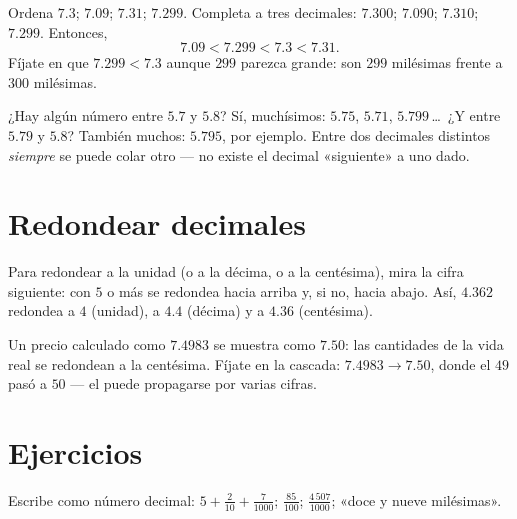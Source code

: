 \begin{example}\label{ex:g5:decimals:order}
Ordena $7.3$; $7.09$; $7.31$; $7.299$. Completa a tres decimales:
$7.300$; $7.090$; $7.310$; $7.299$. Entonces,
\[
7.09 < 7.299 < 7.3 < 7.31 .
\]
Fíjate en que $7.299 < 7.3$ aunque $299$ parezca grande: son $299$ milésimas
frente a $300$ milésimas.
\end{example}

\begin{example}\label{ex:g5:decimals:between}
¿Hay algún número entre $5.7$ y $5.8$? Sí, muchísimos: $5.75$,
$5.71$, $5.799$\,\dots\ ¿Y entre $5.79$ y $5.8$? También muchos:
$5.795$, por ejemplo. Entre dos decimales distintos \emph{siempre} se puede
colar otro --- no existe el decimal «siguiente» a
uno dado.
\end{example}

\section{Redondear decimales}

\begin{definition}[Redondeo]\label{def:g5:decimals:round}
Para redondear a la unidad (o a la décima, o a la centésima), mira la cifra
siguiente: con $5$ o más se redondea hacia arriba y, si no, hacia abajo. Así, $4.362$
redondea a $4$ (unidad), a $4.4$ (décima) y a $4.36$ (centésima).
\end{definition}

\begin{example}\label{ex:g5:decimals:money}
Un precio calculado como $7.4983$ se muestra como $7.50$: las cantidades
de la vida real se redondean a la centésima. Fíjate en la cascada: $7.4983 \to
7.50$, donde el $49$ pasó a $50$ --- el  puede propagarse por
varias cifras.
\end{example}

\section{Ejercicios}

\begin{exercise}[$\star$]\label{exo:g5:decimals:1}
Escribe como número decimal: $5 + \frac{2}{10} + \frac{7}{1000}$;
\quad $\frac{85}{100}$; \quad $\frac{4\,507}{1000}$; \quad «doce
y nueve milésimas».
\end{exercise}

